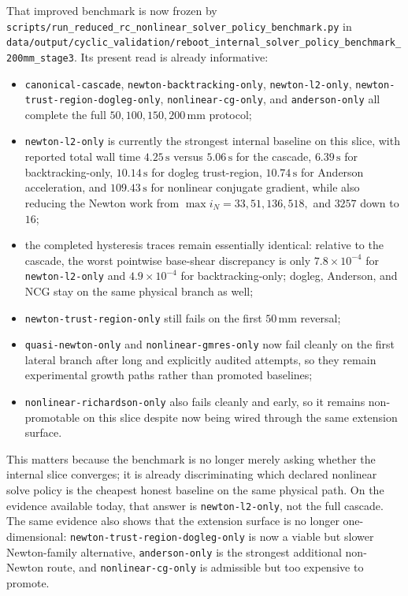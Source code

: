 That improved benchmark is now frozen by
\texttt{scripts/run\_reduced\_rc\_nonlinear\_solver\_policy\_benchmark.py} in
\texttt{data/output/cyclic\_validation/reboot\_internal\_solver\_policy\_benchmark\_200mm\_stage3}.
Its present read is already informative:
\begin{itemize}
  \item \texttt{canonical-cascade}, \texttt{newton-backtracking-only},
    \texttt{newton-l2-only}, \texttt{newton-trust-region-dogleg-only},
    \texttt{nonlinear-cg-only}, and \texttt{anderson-only} all complete the full
    \(50,100,150,200\,\mathrm{mm}\) protocol;
  \item \texttt{newton-l2-only} is currently the strongest internal baseline on
    this slice, with reported total wall time
    \(4.25\,\mathrm{s}\) versus \(5.06\,\mathrm{s}\) for the cascade,
    \(6.39\,\mathrm{s}\) for backtracking-only,
    \(10.14\,\mathrm{s}\) for dogleg trust-region,
    \(10.74\,\mathrm{s}\) for Anderson acceleration, and
    \(109.43\,\mathrm{s}\) for nonlinear conjugate gradient, while also
    reducing the Newton work from \(\max i_N = 33, 51, 136, 518,\) and
    \(3257\) down to \(16\);
  \item the completed hysteresis traces remain essentially identical: relative
    to the cascade, the worst pointwise base-shear discrepancy is only
    \(7.8\times10^{-4}\) for \texttt{newton-l2-only} and
    \(4.9\times10^{-4}\) for backtracking-only; dogleg, Anderson, and NCG stay
    on the same physical branch as well;
  \item \texttt{newton-trust-region-only} still fails on the first
    \(50\,\mathrm{mm}\) reversal;
  \item \texttt{quasi-newton-only} and \texttt{nonlinear-gmres-only} now fail
    cleanly on the first lateral branch after long and explicitly audited
    attempts, so they remain experimental growth paths rather than promoted
    baselines;
  \item \texttt{nonlinear-richardson-only} also fails cleanly and early, so it
    remains non-promotable on this slice despite now being wired through the
    same extension surface.
\end{itemize}
This matters because the benchmark is no longer merely asking whether the
internal slice converges; it is already discriminating which declared nonlinear
solve policy is the cheapest honest baseline on the same physical path.  On the
evidence available today, that answer is \texttt{newton-l2-only}, not the full
cascade.  The same evidence also shows that the extension surface is no longer
one-dimensional: \texttt{newton-trust-region-dogleg-only} is now a viable but
slower Newton-family alternative, \texttt{anderson-only} is the strongest
additional non-Newton route, and \texttt{nonlinear-cg-only} is admissible but
too expensive to promote.

